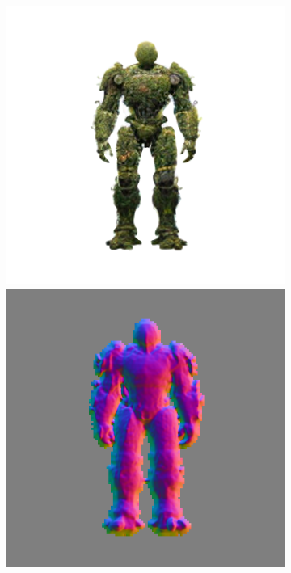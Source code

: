 \begin{figure}[H]
\begin{subfigure}[b]{0.18\textwidth}
        \caption{}
    \end{subfigure}
    \begin{subfigure}[b]{0.18\textwidth}
        \centering
        \fontsize{9pt}{7pt}\selectfont{}
        \includegraphics[width=\textwidth]{etc/a robot made out of plants/wonder3d/test/wonder3D_3000_front_part1}
        \includegraphics[width=\textwidth]{etc/a robot made out of plants/wonder3d/test/wonder3D_3000_front_part4}

\end{subfigure}
\end{figure}
